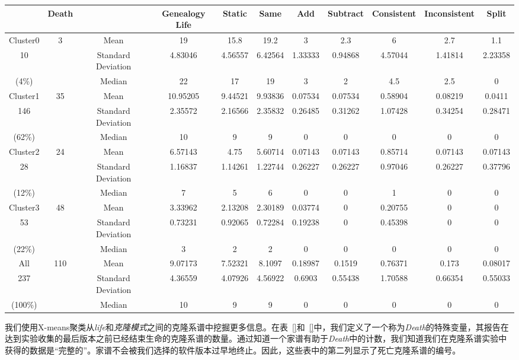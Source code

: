 {\begin{table}[htbp]
\vspace{0.5em}\centering\wuhao
\begin{tabular}{ccccccccccc}
\toprule[1.5pt]
&Death&&Genealogy Life&	Static&	Same&	Add	&Subtract&	Consistent&	Inconsistent&	Split\\
\midrule[1pt]
Cluster0&\multirow{3}{*}{3}&Mean	&19	&15.8	&19.2	&3	&2.3&	6	&2.7&	1.1\\ \cline{3-11}
10&&Standard Deviation	&4.83046	&4.56557&	6.42564	&1.33333&	0.94868&	4.57044&	1.41814	&2.23358\\ \cline{3-11}
(4\%)&&Median	&22&	17&	19&	3&	2	&4.5	&2.5&	0\\ \hline
Cluster1&\multirow{3}{*}{35}&Mean	&10.95205&	9.44521&	9.93836&	0.07534	&0.07534	&0.58904&	0.08219&	0.0411\\ \cline{3-11}
146&&Standard Deviation&2.35572	&2.16566&2.35832	&0.26485	&0.31262&	1.07428&	0.34254&	0.28471\\ \cline{3-11}
(62\%)&&Median&	10&	9&	9	&0&	0	&0	&0&	0\\ \hline
Cluster2&\multirow{3}{*}{24}&Mean	&6.57143&	4.75&	5.60714&	0.07143&	0.07143&	0.85714&	0.07143&	0.07143\\ \cline{3-11}
28&&Standard Deviation	&1.16837&	1.14261	&1.22744	&0.26227&0.26227	&0.97046	&0.26227	&0.37796\\ \cline{3-11}
(12\%)&&Median	&7	&5	&6&	0	&0	&1&	0&	0\\ \hline
Cluster3&\multirow{3}{*}{48}&Mean	&3.33962&	2.13208&	2.30189&	0.03774&	0	&0.20755&	0	&0\\ \cline{3-11}
53&&Standard Deviation&	0.73231	&0.92065	&0.72284&	0.19238&	0&	0.45398	&0	&0\\ \cline{3-11}
(22\%)&&Median	&3&	2&	2	&0&	0&	0	&0&	0\\ \hline
All&\multirow{3}{*}{110}&Mean	&9.07173	&7.52321&	8.1097	&0.18987&	0.1519&	0.76371	&0.173&	0.08017\\ \cline{3-11}
237&&Standard Deviation	&4.36559&	4.07926	&4.56922	&0.6903&	0.55438&	1.70588	&0.66354	&0.55033\\ \cline{3-11}
(100\%)&&Median	&10	&9	&9	&0	&0	&0	&0	&0\\ \hline
\bottomrule[1.5pt]
\end{tabular}
\end{table}

我们使用X-means聚类从{\em life}和{\em 克隆模式}之间的克隆系谱中挖掘更多信息。在表~\ref{}和~\ref{}中，我们定义了一个称为{\em Death}的特殊变量，其报告在达到实验收集的最后版本之前已经结束生命的克隆系谱的数量。通过知道一个家谱有助于{\em Death}中的计数，我们知道我们在克隆系谱实验中获得的数据是“完整的”。家谱不会被我们选择的软件版本过早地终止。因此，这些表中的第二列显示了死亡克隆系谱的编号。

}
